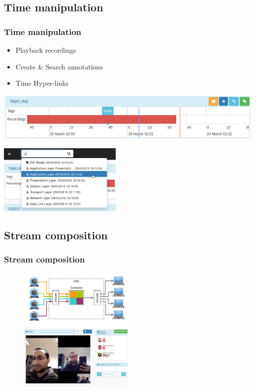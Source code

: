\documentclass[compress]{beamer}
\begin{document}
\subsection{Time manipulation}

		\begin{frame}[c]
		\frametitle{Time manipulation}


		\begin{itemize}
		\item Playback recordings
		\item Create \& Search annotations
		\item Time Hyper-links
		\end{itemize}

			\includegraphics[width=\textwidth]{figures/timeline.png}
				\begin{flushright}

			\vspace*{-12\baselineskip}
			\includegraphics[width=0.45\textwidth]{figures/search.png}
		\end{flushright}
		

		\end{frame}


\subsection{Stream composition}

		\begin{frame}[c]
		\frametitle{Stream composition}
		\begin{figure}
			\includegraphics[width=0.5\textwidth]{figures/wcomposite.pdf}
			\includegraphics[width=0.5\textwidth]{figures/devices.png}
		\end{figure}
		\end{frame}
\end{document}
